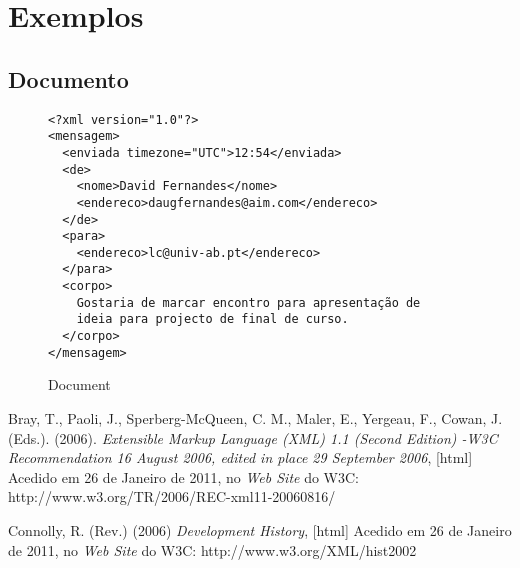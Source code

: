 \documentclass[a4,11pt]{article}
\begin{document}
\pagebreak 

\section{Exemplos}

\subsection{Documento}\label{Document} 
\begin{figure}[h]
\begin{verbatim}
<?xml version="1.0"?>
<mensagem>
  <enviada timezone="UTC">12:54</enviada>
  <de>
    <nome>David Fernandes</nome>
    <endereco>daugfernandes@aim.com</endereco>
  </de>
  <para>
    <endereco>lc@univ-ab.pt</endereco>
  </para>
  <corpo>
    Gostaria de marcar encontro para apresentação de 
    ideia para projecto de final de curso.
  </corpo>
</mensagem>
\end{verbatim}
\caption{Document}
\end{figure}

\pagebreak

\begin{thebibliography}{9}
Bray, T., Paoli, J., Sperberg-McQueen, C. M., Maler, E., Yergeau, F., Cowan, J. (Eds.). (2006).
 \emph{Extensible Markup Language (XML) 1.1 (Second Edition) -W3C Recommendation 16 August 2006, edited in place 29 September 2006}, [html] Acedido em 26 de Janeiro de 2011, no \emph{Web Site} do W3C: http://www.w3.org/TR/2006/REC-xml11-20060816/

Connolly, R. (Rev.) (2006)
 \emph{Development History}, [html] Acedido em 26 de Janeiro de 2011, no \emph{Web Site} do W3C: http://www.w3.org/XML/hist2002

\end{thebibliography}
\end{document}
